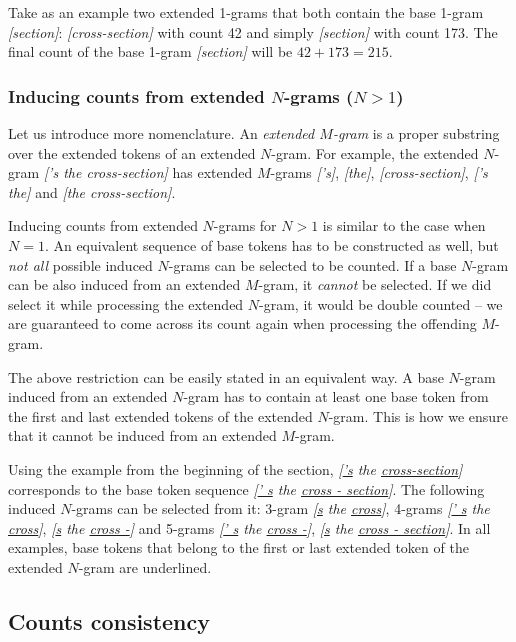 \documentclass[draft]{IIBproject}
\DeclareRobustCommand{\ngram}[1]{\emph{[#1]}}
\begin{document}
Take as an example two extended 1-grams that both contain the base 1-gram \ngram{section}: \ngram{cross-section} with count 42 and simply \ngram{section} with count 173. The final count of the base 1-gram \ngram{section} will be $42+173=215$.

\subsubsection{Inducing counts from extended $N$-grams ($N > 1$)}

Let us introduce more nomenclature. An \emph{extended $M$-gram} is a proper substring over the extended tokens of an extended $N$-gram. For example, the extended $N$-gram \ngram{'s the \mbox{cross-section}} has extended $M$-grams \ngram{'s}, \ngram{the}, \ngram{\mbox{cross-section}}, \ngram{'s the} and \ngram{the \mbox{cross-section}}.

Inducing counts from extended $N$-grams for $N>1$ is similar to the case when $N=1$. An equivalent sequence of base tokens has to be constructed as well, but \emph{not all} possible induced $N$-grams can be selected to be counted. If a base $N$-gram can be also induced from an extended $M$-gram, it \emph{cannot} be selected. If we did select it while processing the extended $N$-gram, it would be double counted -- we are guaranteed to come across its count again when processing the offending $M$-gram.

The above restriction can be easily stated in an equivalent way. A base $N$-gram induced from an extended $N$-gram has to contain at least one base token from the first and last extended tokens of the extended $N$-gram. This is how we ensure that it cannot be induced from an extended $M$-gram.

Using the example from the beginning of the section, \ngram{\underline{'s} the \mbox{\underline{cross-section}}} corresponds to the base token sequence \ngram{\underline{' s} the \underline{cross - section}}. The following induced $N$-grams can be selected from it: 3-gram \ngram{\underline{s} the \underline{cross}}, 4-grams \ngram{\underline{' s} the \underline{cross}}, \ngram{\underline{s} the \underline{cross -}} and 5-grams \ngram{\underline{' s} the \underline{cross -}}, \ngram{\underline{s} the \underline{cross - section}}. In all examples, base tokens that belong to the first or last extended token of the extended $N$-gram are underlined.

\FloatBarrier
\subsection{Counts consistency}
\label{sec:counts_consistency}
\end{document}
